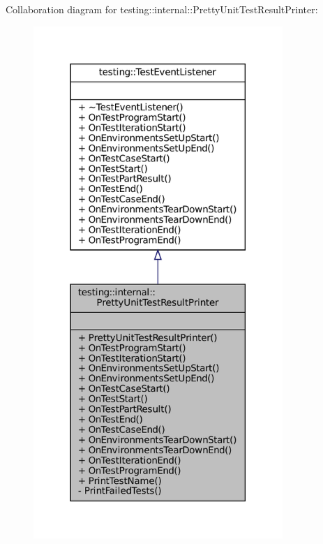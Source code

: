 Collaboration diagram for testing\+:\+:internal\+:\+:Pretty\+Unit\+Test\+Result\+Printer\+:
\nopagebreak
\begin{figure}[H]
\begin{center}
\leavevmode
\includegraphics[height=550pt]{classtesting_1_1internal_1_1PrettyUnitTestResultPrinter__coll__graph}
\end{center}
\end{figure}
